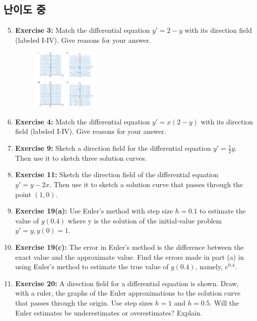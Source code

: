 \documentclass[12pt, a4paper]{article}
\begin{document}
\subsection*{난이도 중 }
\begin{enumerate}
    \setcounter{enumi}{4} %
    \item \textbf{Exercise 3:} Match the differential equation $y' = 2 - y$ with its direction field (labeled I-IV). Give reasons for your answer.
    
     \begin{figure}[htbp]
        \centering
        \includegraphics[width=0.3\textwidth]{graph2.png} %
    \end{figure}


    \item \textbf{Exercise 4:} Match the differential equation $y' = x(2 - y)$ with its direction field (labeled I-IV). Give reasons for your answer.

    \item \textbf{Exercise 9:} Sketch a direction field for the differential equation $y' = \frac{1}{2}y$. Then use it to sketch three solution curves.

    \item \textbf{Exercise 11:} Sketch the direction field of the differential equation $y' = y - 2x$. Then use it to sketch a solution curve that passes through the point $(1,0)$.

    \item \textbf{Exercise 19(a):} Use Euler's method with step size $h=0.1$ to estimate the value of $y(0.4)$ where y is the solution of the initial-value problem $y' = y, y(0)=1$.

    \item \textbf{Exercise 19(c):} The error in Euler's method is the difference between the exact value and the approximate value. Find the errors made in part (a) in using Euler's method to estimate the true value of $y(0.4)$, namely, $e^{0.4}$.

    \item \textbf{Exercise 20:} A direction field for a differential equation is shown. Draw, with a ruler, the graphs of the Euler approximations to the solution curve that passes through the origin. Use step sizes $h=1$ and $h=0.5$. Will the Euler estimates be underestimates or overestimates? Explain.
    

\end{enumerate}
\end{document}
